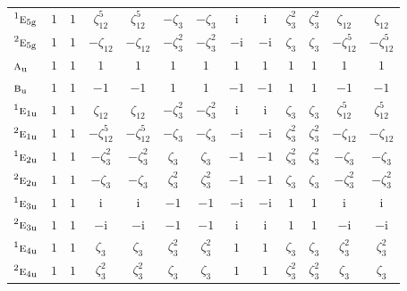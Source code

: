 \documentclass[10pt,a4paper]{article}
\numberwithin{equation}{section}
\newcommand{\irr}[1]{\text{\normalfont\scshape #1}}
\newcommand{\conjpair}[1]{{}^{#1}}
\newcommand{\ptag}[1]{\mathrm{#1}}
\newcommand{\iunit}{\mathrm{i}}
\newcommand{\rootunity}[1]{\zeta_{#1}}
\begin{document}
{\begin{longtable}{@{}lcccccccccccc@{}}
$\conjpair{1}\irr{e}_{5\ptag{g}}$ & $1$ & $1$ & $\rootunity{12}^{5}$ & $\rootunity{12}^{5}$ & $-\rootunity{3}$ & $-\rootunity{3}$ & $\iunit{}$ & $\iunit{}$ & $\rootunity{3}^{2}$ & $\rootunity{3}^{2}$ & $\rootunity{12}$ & $\rootunity{12}$\\
$\conjpair{2}\irr{e}_{5\ptag{g}}$ & $1$ & $1$ & $-\rootunity{12}$ & $-\rootunity{12}$ & $-\rootunity{3}^{2}$ & $-\rootunity{3}^{2}$ & $-\iunit{}$ & $-\iunit{}$ & $\rootunity{3}$ & $\rootunity{3}$ & $-\rootunity{12}^{5}$ & $-\rootunity{12}^{5}$\\
$\irr{a}_{\ptag{u}}$ & $1$ & $1$ & $1$ & $1$ & $1$ & $1$ & $1$ & $1$ & $1$ & $1$ & $1$ & $1$\\
$\irr{b}_{\ptag{u}}$ & $1$ & $1$ & $-1$ & $-1$ & $1$ & $1$ & $-1$ & $-1$ & $1$ & $1$ & $-1$ & $-1$\\
$\conjpair{1}\irr{e}_{1\ptag{u}}$ & $1$ & $1$ & $\rootunity{12}$ & $\rootunity{12}$ & $-\rootunity{3}^{2}$ & $-\rootunity{3}^{2}$ & $\iunit{}$ & $\iunit{}$ & $\rootunity{3}$ & $\rootunity{3}$ & $\rootunity{12}^{5}$ & $\rootunity{12}^{5}$\\
$\conjpair{2}\irr{e}_{1\ptag{u}}$ & $1$ & $1$ & $-\rootunity{12}^{5}$ & $-\rootunity{12}^{5}$ & $-\rootunity{3}$ & $-\rootunity{3}$ & $-\iunit{}$ & $-\iunit{}$ & $\rootunity{3}^{2}$ & $\rootunity{3}^{2}$ & $-\rootunity{12}$ & $-\rootunity{12}$\\
$\conjpair{1}\irr{e}_{2\ptag{u}}$ & $1$ & $1$ & $-\rootunity{3}^{2}$ & $-\rootunity{3}^{2}$ & $\rootunity{3}$ & $\rootunity{3}$ & $-1$ & $-1$ & $\rootunity{3}^{2}$ & $\rootunity{3}^{2}$ & $-\rootunity{3}$ & $-\rootunity{3}$\\
$\conjpair{2}\irr{e}_{2\ptag{u}}$ & $1$ & $1$ & $-\rootunity{3}$ & $-\rootunity{3}$ & $\rootunity{3}^{2}$ & $\rootunity{3}^{2}$ & $-1$ & $-1$ & $\rootunity{3}$ & $\rootunity{3}$ & $-\rootunity{3}^{2}$ & $-\rootunity{3}^{2}$\\
$\conjpair{1}\irr{e}_{3\ptag{u}}$ & $1$ & $1$ & $\iunit{}$ & $\iunit{}$ & $-1$ & $-1$ & $-\iunit{}$ & $-\iunit{}$ & $1$ & $1$ & $\iunit{}$ & $\iunit{}$\\
$\conjpair{2}\irr{e}_{3\ptag{u}}$ & $1$ & $1$ & $-\iunit{}$ & $-\iunit{}$ & $-1$ & $-1$ & $\iunit{}$ & $\iunit{}$ & $1$ & $1$ & $-\iunit{}$ & $-\iunit{}$\\
$\conjpair{1}\irr{e}_{4\ptag{u}}$ & $1$ & $1$ & $\rootunity{3}$ & $\rootunity{3}$ & $\rootunity{3}^{2}$ & $\rootunity{3}^{2}$ & $1$ & $1$ & $\rootunity{3}$ & $\rootunity{3}$ & $\rootunity{3}^{2}$ & $\rootunity{3}^{2}$\\
$\conjpair{2}\irr{e}_{4\ptag{u}}$ & $1$ & $1$ & $\rootunity{3}^{2}$ & $\rootunity{3}^{2}$ & $\rootunity{3}$ & $\rootunity{3}$ & $1$ & $1$ & $\rootunity{3}^{2}$ & $\rootunity{3}^{2}$ & $\rootunity{3}$ & $\rootunity{3}$\\

\end{longtable}}
\end{document}

